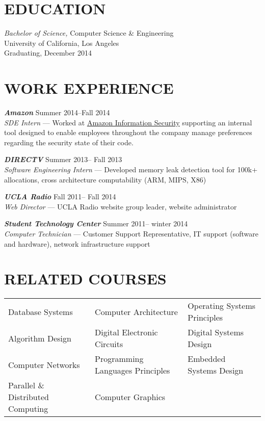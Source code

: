 \documentclass[line,letterpaper]{resume}
\begin{document}
\address{\href{www.aclander.com}{Personal website --- www.aclander.com}}
\address{\href{mailto:nathan.aclander@ucla.com}{nathan.aclander@ucla.com} --- (949) 436-8945}


\begin{resume}
    \vspace{-24pt}
    \section{\uppercase{Education}} {\sl Bachelor of Science,} \/
    Computer Science \& Engineering \\
    University of California, Los Angeles\\
    Graduating, December 2014 \\

    \vspace{-16pt}

	\section{\uppercase{Work Experience}} {\sl\textbf{Amazon}} \hfill
    Summer 2014--Fall 2014\\
    \emph{SDE Intern} --- Worked at \underline{\href{http://security.amazon-jobs.com/index.html}
    {Amazon Information Security}} supporting an internal tool designed to 
	enable employees throughout the company manage preferences regarding the 
	security state of their code.

    {\sl\textbf{DIRECTV}} \hfill Summer 2013-- Fall 2013\\
    \emph{Software Engineering Intern}
    ---  Developed memory leak detection tool for 100k+ allocations,
	cross architecture computability (ARM, MIPS, X86)

    {\sl\textbf{UCLA Radio}} \hfill Fall 2011-- Fall 2014\\
    \emph{Web Director} --- UCLA Radio website group leader, website administrator

    {\sl\textbf{Student Technology Center}} \hfill Summer 2011-- winter 2014\\
    \emph{Computer Technician} --- Customer Support Representative,
IT support (software and hardware), network infrastructure support
    \vspace{-6pt}

	\section{\uppercase{Related Courses}}
	\begin{tabular}{l l l}
	Database Systems & Computer Architecture & Operating Systems  Principles \\
	Algorithm Design & Digital Electronic Circuits & Digital Systems Design \\
	Computer Networks & Programming Languages Principles& Embedded Systems Design\\
    Parallel \& Distributed Computing & Computer Graphics\\
	\end{tabular}


\end{resume}
\end{document}
